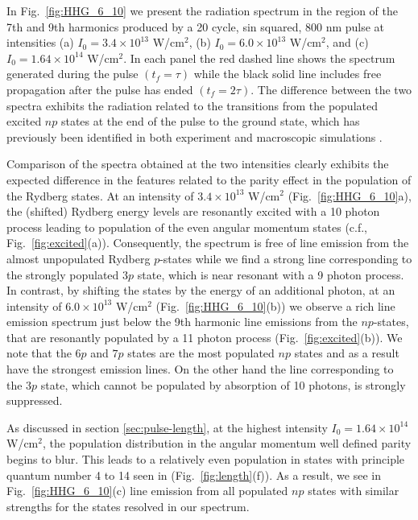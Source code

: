 In Fig.~\ref{fig:HHG_6_10} we present the radiation spectrum in the region of the 7th and 9th harmonics produced by a 20 cycle, sin squared, 800 nm pulse at intensities (a) $I_0 = 3.4\times10^{13}$ W/cm$^2$, (b) $I_0 = 6.0\times10^{13}$ W/cm$^2$, and (c) $I_0 = 1.64\times10^{14}$ W/cm$^2$. In each panel the red dashed line shows the spectrum generated during the pulse $(t_f = \tau)$ while the black solid line includes free propagation after the pulse has ended $(t_f = 2\tau)$. The difference between the two spectra exhibits the radiation related to the transitions from the populated excited $np$ states at the end of the pulse to the ground state, which has previously been identified in both experiment \cite{chini14} and macroscopic simulations \cite{camp15,beaulieu16}.

Comparison of the spectra obtained at the two intensities clearly exhibits the expected difference in the features related to the parity effect in the population of the Rydberg states. At an intensity of $3.4\times10^{13}$ W/cm$^2$ (Fig.~\ref{fig:HHG_6_10}a), the (shifted) Rydberg energy levels are resonantly excited with a 10 photon process leading to population of the even angular momentum states (c.f., Fig.~\ref{fig:excited}(a)). Consequently, the spectrum is free of line emission from the almost unpopulated Rydberg $p$-states while we find a strong line corresponding to the strongly populated $3p$ state, which is near resonant with a 9 photon process. In contrast, by shifting the states by the energy of an additional photon, at an intensity of $6.0\times10^{13}$ W/cm$^2$ (Fig.~\ref{fig:HHG_6_10}(b)) we observe a rich line emission spectrum just below the 9th harmonic line emissions from the $np$-states, that are resonantly populated by a 11 photon process (Fig.~\ref{fig:excited}(b)). We note that the $6p$ and $7p$ states are the most populated $np$ states and as a result have the strongest emission lines. On the other hand the line corresponding to the $3p$ state, which cannot be populated by absorption of 10 photons, is strongly suppressed.

As discussed in section \ref{sec:pulse-length}, at the highest intensity $I_0=1.64\times10^{14}$ W/cm$^2$, the population distribution in the angular momentum well defined parity begins to blur. This leads to a relatively even population in states with principle quantum number 4 to 14 seen in (Fig.~\ref{fig:length}(f)). As a result, we see in Fig.~\ref{fig:HHG_6_10}(c) line emission from all populated $np$ states with similar strengths for the states resolved in our spectrum.


